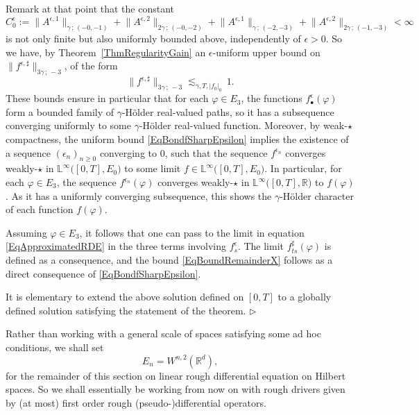 \documentclass[11pt,a4paper]{amsart}
\newcommand{\RR}{\mathbb{R}}  \newcommand{\CC}{\mathbb{C}}  \newcommand{\LL}{\mathbb{L}}  \newcommand{\WW}{\mathbb{W}}
\renewcommand{\geq}{\geqslant}
\newcommand{\ssk}{\smallskip}
\numberwithin{equation}{section} %
\newenvironment{Dem}{%
    \begin{list}{\hspace{0.5cm}{\sc Proof --}}{%
        \setlength{\topsep}{0pt}%
        \setlength{\leftmargin}{0pt}%
        \setlength{\rightmargin}{0pt}%
        \setlength{\listparindent}{0pt}%
        \setlength{\itemindent}{0pt}%
        \setlength{\parsep}{0pt}%
        \addtolength{\leftmargin}{20pt}%
        \addtolength{\rightmargin}{0pt}%
    } \item }{\hfill{\space $\rhd$}\end{list}\smallskip}
\begin{document}
\begin{Dem}
\ssk

Remark at that point that the constant 
\begin{equation*}
C^\epsilon_0 := \big\|A^{\epsilon,1}\big\|_{\gamma\,;\,(-0,-1)}  + \big\|A^{\epsilon,2}\big\|_{2\gamma\,;\,(-0,-2)} +  \big\|A^{\epsilon,1}\big\|_{\gamma\,;\,(-2,-3)}  + \big\|A^{\epsilon,2}\big\|_{2\gamma\,;\,(-1,-3)}  < \infty
\end{equation*}
is not only finite but also uniformly bounded above, independently of $\epsilon>0$. So we have, by Theorem~\ref{ThmRegularityGain}  an $\epsilon$-uniform upper bound on $\big\|f^{\epsilon,\sharp}\big\|_{3\gamma\,;\,-3}$, of the form
\begin{equation}
\label{EqBondfSharpEpsilon}
\big\|f^{\epsilon,\sharp}\big\|_{3\gamma\,;\,-3} \lesssim_{\gamma,T,| f_0|_0}\,1. 
\end{equation}
These bounds ensure in particular that for each $\varphi\in E_3$, the functions $f^\epsilon_\bullet(\varphi)$ form a bounded family of $\gamma$-H\"older real-valued paths, so it has a subsequence converging uniformly to some $\gamma$-H\"older real-valued function. Moreover, by weak-$\star$ compactness, the uniform bound \eqref{EqBondfSharpEpsilon} implies the existence of a sequence $(\epsilon_n)_{n\geq 0}$ converging to $0$, such that the sequence $f^{\epsilon_n}$ converges weakly-$\star$ in $\LL^\infty\big([0,T],E_0\big)$ to some limit $f\in\LL^\infty\big([0,T],E_0\big)$. In particular, for each $\varphi\in E_3$, the sequence $f^{\epsilon_n}(\varphi)$ converges weakly-$\star$ in $\LL^\infty\big([0,T],\RR\big)$ to $f(\varphi)$. As it has a uniformly converging subsequence, this shows the $\gamma$-H\"older character of each function $f(\varphi)$. 

Assuming $\varphi\in E_3$, it follows that one can pass to the limit in equation \eqref{EqApproximatedRDE} in the three terms involving $f^\epsilon_s$. The limit $f^\sharp_{ts}(\varphi)$ is defined as a consequence, and the bound \eqref{EqBoundRemainderX} follows as a direct consequence of \eqref{EqBondfSharpEpsilon}.

\ssk 

It is elementary to extend the above solution defined on $[0,T]$ to a globally defined solution satisfying the statement of the theorem.
\end{Dem}

\bigskip

Rather than working with a general scale of spaces satisfying some ad hoc conditions, we shall set 
$$
E_n = W^{n,2}(\RR^d),
$$
for the remainder of this section on linear rough differential equation on Hilbert spaces. So we shall essentially be working from now on with rough drivers given by (at most) first order rough (pseudo-)differential operators. 
\end{document}
